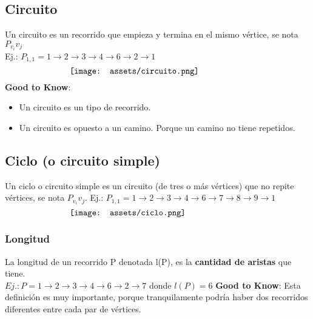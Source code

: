 \documentclass[10pt,a4paper]{article}
\begin{document}
\subsection*{Circuito}
Un circuito es un recorrido que empieza y termina en el mismo vértice, se nota $P_{v_{i}}{v_{j}}$ \\
Ej.: $P_{1,1} = 1 \rightarrow 2 \rightarrow 3 \rightarrow 4 \rightarrow 6 \rightarrow 2 \rightarrow 1$
\[\begin{minipage}[b]{0.6\textwidth}
    \texttt{[image: assets/circuito.png]}
\end{minipage}\]
\textbf{Good to Know}:
\begin{itemize}
    \item Un circuito es un tipo de recorrido. 
    \item Un circuito es opuesto a un camino. Porque un camino no tiene repetidos.
\end{itemize}
\subsection*{Ciclo (o circuito simple)}
Un ciclo o circuito simple es un circuito (de tres o más vértices) que no repite vértices, se nota $P_{v_{i}}{v_{j}}$.
Ej.: $P_{1,1} = 1 \rightarrow 2 \rightarrow 3 \rightarrow 4 \rightarrow 6 \rightarrow 7 \rightarrow 8 \rightarrow 9 \rightarrow 1$
\[\begin{minipage}[b]{0.6\textwidth}
    \texttt{[image: assets/ciclo.png]}
\end{minipage}\]
\subsubsection*{Longitud}
La longitud de un recorrido P denotada l(P), es la \textbf{cantidad de aristas} que tiene. \\
$Ej.: P = 1 \rightarrow 2 \rightarrow 3 \rightarrow 4 \rightarrow 6 \rightarrow 2 \rightarrow 7$ donde $l(P) = 6$
\textbf{Good to Know}: Esta definición es muy importante, porque tranquilamente podría haber dos recorridos diferentes entre cada par de vértices.
\end{document}
